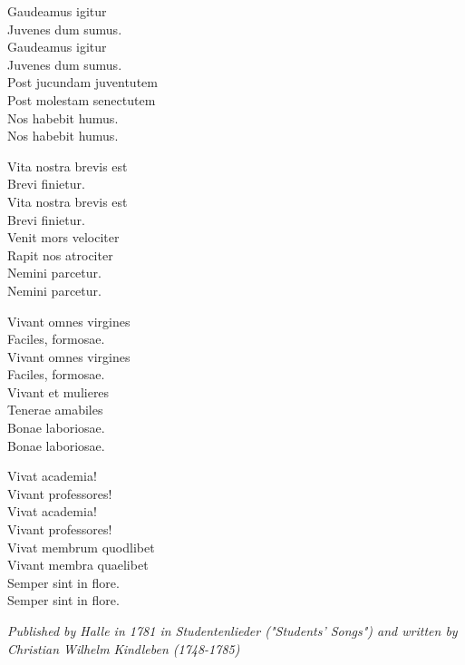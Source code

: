 \vspace{10pt}
Gaudeamus igitur\\
Juvenes dum sumus.\\
Gaudeamus igitur\\
Juvenes dum sumus.\\
Post jucundam juventutem\\
Post molestam senectutem\\
Nos habebit humus.\\
Nos habebit humus.\par
\vspace{10pt}
Vita nostra brevis est\\
Brevi finietur.\\
Vita nostra brevis est\\
Brevi finietur.\\
Venit mors velociter\\
Rapit nos atrociter\\
Nemini parcetur.\\
Nemini parcetur.\par
\newpage
Vivant omnes virgines\\
Faciles, formosae.\\
Vivant omnes virgines\\
Faciles, formosae.\\
Vivant et mulieres\\
Tenerae amabiles\\
Bonae laboriosae.\\
Bonae laboriosae.\par
\vspace{10pt}
Vivat academia!\\
Vivant professores!\\
Vivat academia!\\
Vivant professores!\\
Vivat membrum quodlibet\\
Vivant membra quaelibet\\
Semper sint in flore.\\
Semper sint in flore.\par
\vspace{10pt}
{\footnotesize\textit{Published by Halle in 1781 in Studentenlieder ("Students' Songs") and written by Christian Wilhelm Kindleben (1748-1785)}}

